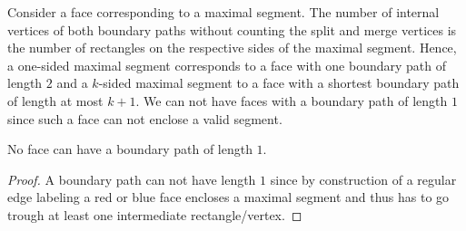     Consider a face corresponding to a maximal segment.
    The number of internal vertices of both boundary paths without counting the split and merge vertices is the number of rectangles on the respective sides of the maximal segment.
    Hence, a one-sided maximal segment corresponds to a face with one boundary path of length $2$  and a $k$-sided maximal segment to a face with a shortest boundary path of length at most $k+1$.
    We can not have faces with a boundary path of length $1$ since such a face can not enclose a valid segment.

    \begin{lemma}
      \label{lm:rel:noBpOfLength1}
      No face can have a boundary path of length $1$.
    \end{lemma}
    \begin{proof}
      A boundary path can not have length $1$ since by construction of a regular edge labeling a red or blue face encloses a maximal segment and thus has to go trough at least one intermediate rectangle/vertex.
    \end{proof}
